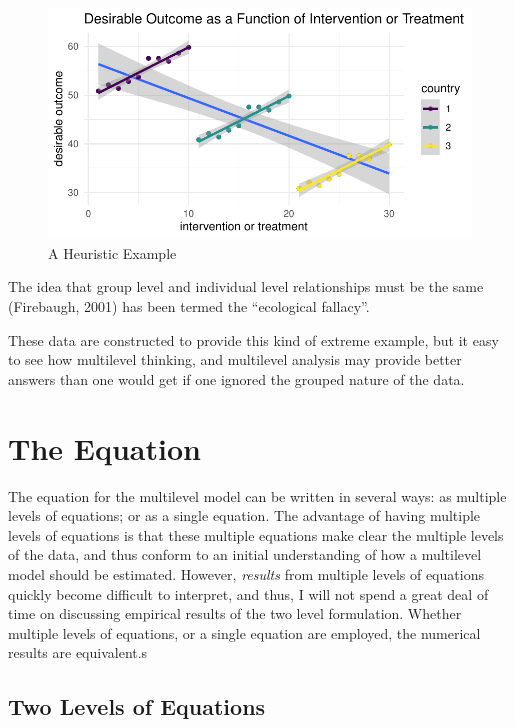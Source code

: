 \documentclass[
  letterpaper,
  DIV=11,
  numbers=noendperiod]{scrreprt}
\begin{document}
\begin{figure}[H]

{\centering \includegraphics{cross-sectional_files/figure-pdf/unnamed-chunk-9-1.pdf}

}

\caption{A Heuristic Example}

\end{figure}%

The idea that group level and individual level relationships must be the
same (Firebaugh, 2001) has been termed the ``ecological fallacy''.

These data are constructed to provide this kind of extreme example, but
it easy to see how multilevel thinking, and multilevel analysis may
provide better answers than one would get if one ignored the grouped
nature of the data.

\section{The Equation}\label{the-equation}

The equation for the multilevel model can be written in several ways: as
multiple levels of equations; or as a single equation. The advantage of
having multiple levels of equations is that these multiple equations
make clear the multiple levels of the data, and thus conform to an
initial understanding of how a multilevel model should be estimated.
However, \emph{results} from multiple levels of equations quickly become
difficult to interpret, and thus, I will not spend a great deal of time
on discussing empirical results of the two level formulation. Whether
multiple levels of equations, or a single equation are employed, the
numerical results are equivalent.s

\subsection{Two Levels of Equations}\label{two-levels-of-equations}
\end{document}
